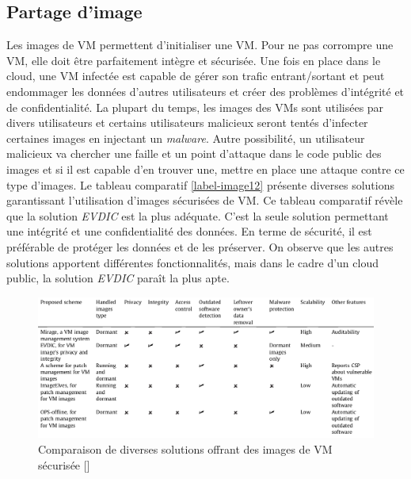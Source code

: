 \subsection{Partage d'image}
Les images de VM permettent d'initialiser une VM. Pour ne pas corrompre une VM, elle doit être parfaitement intègre et sécurisée. Une fois en place dans le cloud, une VM infectée est capable de gérer son trafic entrant/sortant et peut endommager les données d'autres utilisateurs et créer des problèmes d'intégrité et de confidentialité.
La plupart du temps, les images des VMs sont utilisées par divers utilisateurs et certains utilisateurs malicieux seront tentés d'infecter certaines images en injectant un \textit{malware}. Autre possibilité, un utilisateur malicieux va chercher une faille et un point d'attaque dans le code public des images et si il est capable d'en trouver une, mettre en place une attaque contre ce type d'images. Le tableau comparatif \ref{label-image12} présente diverses solutions garantissant l'utilisation d'images sécurisées de VM. Ce tableau comparatif révèle que la solution \textit{EVDIC} est la plus adéquate. C'est la seule solution permettant une intégrité et une confidentialité des données. En terme de sécurité, il est préférable de protéger les données et de les préserver. On observe que les autres solutions apportent différentes fonctionnalités, mais dans le cadre d'un cloud public, la solution \textit{EVDIC} paraît la plus apte.

\begin{figure}[h]
	\center
	\includegraphics[width=15.5cm]{./pics/securing_VM_images_tableau.png}
	\caption{Comparaison de diverses solutions offrant des images de VM sécurisée [\cite{security_cloud_survey}]}
	\label{label-image13}
\end{figure}


